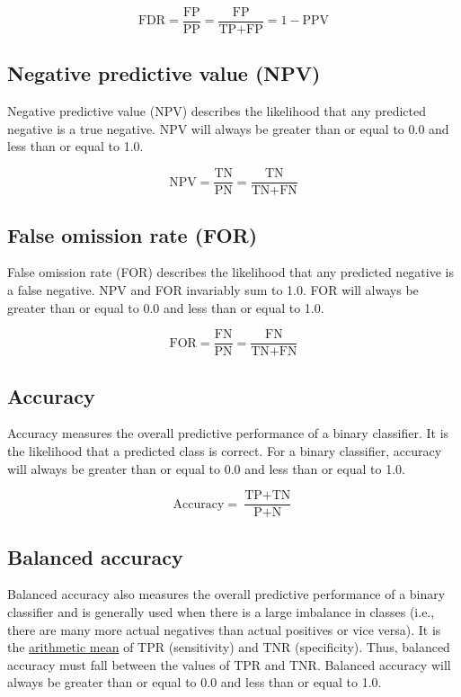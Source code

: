 \documentclass[letterpaper, 12pt]{article}
\begin{document}
$$\textrm{FDR} = \frac{\textrm{FP}}{\textrm{PP}} = \frac{\textrm{FP}}{\textrm{TP} + \textrm{FP}} = 1 - \textrm{PPV}$$

\subsection*{Negative predictive value (NPV)}

Negative predictive value (NPV) describes the likelihood that any predicted negative is a true negative. NPV will always be greater than or equal to 0.0 and less than or equal to 1.0.

$$\textrm{NPV} = \frac{\textrm{TN}}{\textrm{PN}} = \frac{\textrm{TN}}{\textrm{TN} + \textrm{FN}}$$

\subsection*{False omission rate (FOR)}

False omission rate (FOR) describes the likelihood that any predicted negative is a false negative. NPV and FOR invariably sum to 1.0. FOR will always be greater than or equal to 0.0 and less than or equal to 1.0.

$$\textrm{FOR} = \frac{\textrm{FN}}{\textrm{PN}} = \frac{\textrm{FN}}{\textrm{TN} + \textrm{FN}}$$

\subsection*{Accuracy}

Accuracy measures the overall predictive performance of a binary classifier. It is the likelihood that a predicted class is correct. For a binary classifier, accuracy will always be greater than or equal to 0.0 and less than or equal to 1.0.

$$\textrm{Accuracy} = \frac{\textrm{TP} + \textrm{TN}}{\textrm{P} + \textrm{N}}$$

\subsection*{Balanced accuracy}

Balanced accuracy also measures the overall predictive performance of a binary classifier and is generally used when there is a large imbalance in classes (i.e., there are many more actual negatives than actual positives or vice versa). It is the \href{https://en.wikipedia.org/wiki/Arithmetic_mean}{arithmetic mean} of TPR (sensitivity) and TNR (specificity). Thus, balanced accuracy must fall between the values of TPR and TNR. Balanced accuracy will always be greater than or equal to 0.0 and less than or equal to 1.0.
\end{document}
